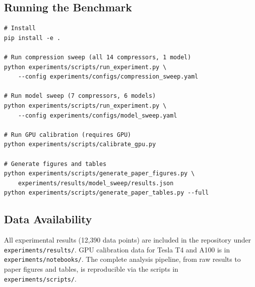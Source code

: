 \documentclass{article}
\begin{document}
\subsection{Running the Benchmark}

\begin{verbatim}
# Install
pip install -e .

# Run compression sweep (all 14 compressors, 1 model)
python experiments/scripts/run_experiment.py \
    --config experiments/configs/compression_sweep.yaml

# Run model sweep (7 compressors, 6 models)
python experiments/scripts/run_experiment.py \
    --config experiments/configs/model_sweep.yaml

# Run GPU calibration (requires GPU)
python experiments/scripts/calibrate_gpu.py

# Generate figures and tables
python experiments/scripts/generate_paper_figures.py \
    experiments/results/model_sweep/results.json
python experiments/scripts/generate_paper_tables.py --full
\end{verbatim}

\subsection{Data Availability}

All experimental results (12{,}390 data points) are included in the repository under \texttt{experiments/results/}. GPU calibration data for Tesla T4 and A100 is in \texttt{experiments/notebooks/}. The complete analysis pipeline, from raw results to paper figures and tables, is reproducible via the scripts in \texttt{experiments/scripts/}.
\end{document}
